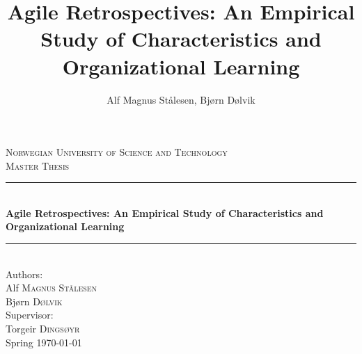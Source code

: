 \documentclass[12pt, a4paper]{report}
\newcommand{\HRule}{\rule{\linewidth}{0.5mm}}
\begin{document}
\title{Agile Retrospectives: An Empirical Study of Characteristics and Organizational Learning}

\author{Alf Magnus Stålesen, Bjørn Dølvik}
\begin{titlepage}
\begin{center}

\textsc{\LARGE Norwegian University of Science and Technology}\\[1.5cm]

\textsc{\Large Master Thesis}\\[0.5cm]

\HRule \\[0.4cm]
{ \huge \bfseries Agile Retrospectives: An Empirical Study of Characteristics and Organizational Learning\\[0.4cm] }

\HRule \\[1.5cm]

{\large Authors:}\\

Alf \textsc{Magnus Stålesen}\\
Bjørn \textsc{Dølvik}\\[1.0cm]

{\large Supervisor:}\\

Torgeir \textsc{Dingsøyr}\\[1.0cm]

{\large Spring}
{\large \today}

\end{center}
\end{titlepage}
\end{document}

